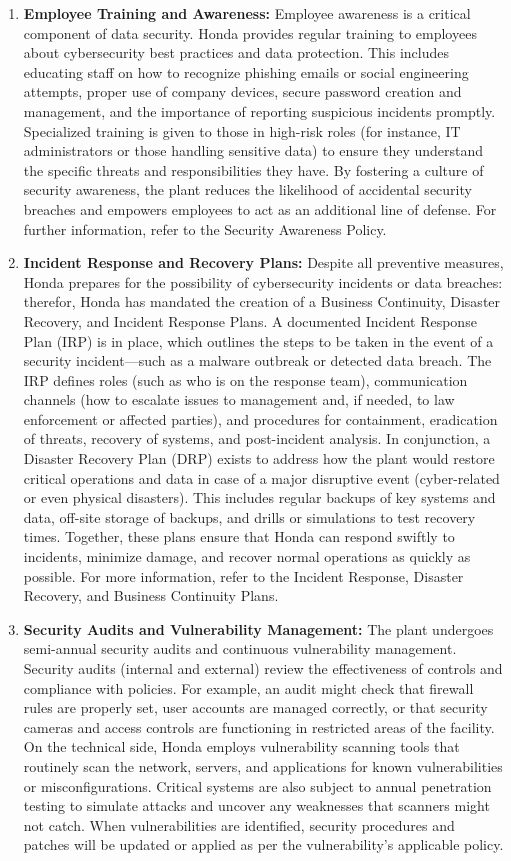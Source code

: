 \begin{enumerate}
    \item \textbf{Employee Training and Awareness:} Employee awareness is a critical component of data security. Honda provides regular training to employees about cybersecurity best practices and data protection. This includes educating staff on how to recognize phishing emails or social engineering attempts, proper use of company devices, secure password creation and management, and the importance of reporting suspicious incidents promptly. Specialized training is given to those in high-risk roles (for instance, IT administrators or those handling sensitive data) to ensure they understand the specific threats and responsibilities they have. By fostering a culture of security awareness, the plant reduces the likelihood of accidental security breaches and empowers employees to act as an additional line of defense. For further information, refer to the Security Awareness Policy.
    \item \textbf{Incident Response and Recovery Plans:} Despite all preventive measures, Honda prepares for the possibility of cybersecurity incidents or data breaches: therefor, Honda has mandated the creation of a Business Continuity, Disaster Recovery, and Incident Response Plans. A documented Incident Response Plan (IRP) is in place, which outlines the steps to be taken in the event of a security incident---such as a malware outbreak or detected data breach. The IRP defines roles (such as who is on the response team), communication channels (how to escalate issues to management and, if needed, to law enforcement or affected parties), and procedures for containment, eradication of threats, recovery of systems, and post-incident analysis. In conjunction, a Disaster Recovery Plan (DRP) exists to address how the plant would restore critical operations and data in case of a major disruptive event (cyber-related or even physical disasters). This includes regular backups of key systems and data, off-site storage of backups, and drills or simulations to test recovery times. Together, these plans ensure that Honda can respond swiftly to incidents, minimize damage, and recover normal operations as quickly as possible. For more information, refer to the Incident Response, Disaster Recovery, and Business Continuity Plans.
    \item \textbf{Security Audits and Vulnerability Management:} The plant undergoes semi-annual security audits and continuous vulnerability management. Security audits (internal and external) review the effectiveness of controls and compliance with policies. For example, an audit might check that firewall rules are properly set, user accounts are managed correctly, or that security cameras and access controls are functioning in restricted areas of the facility. On the technical side, Honda employs vulnerability scanning tools that routinely scan the network, servers, and applications for known vulnerabilities or misconfigurations. Critical systems are also subject to annual penetration testing to simulate attacks and uncover any weaknesses that scanners might not catch. When vulnerabilities are identified, security procedures and patches will be updated or applied as per the vulnerability's applicable policy.

\end{enumerate}
